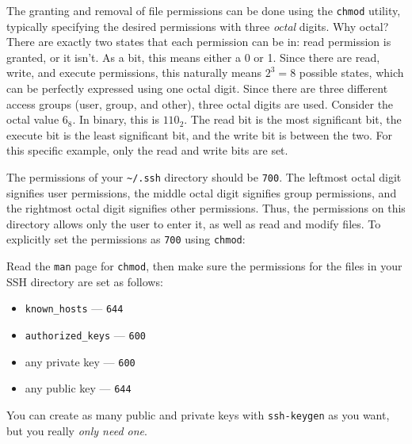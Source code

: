 The granting and removal of file permissions can be done using the
\texttt{chmod} utility, typically specifying the desired permissions
with three \emph{octal} digits. Why octal? There are exactly two states that
each permission can be in: read permission is granted, or it isn't. As a
bit, this means either a 0 or 1. Since there are read, write, and
execute permissions, this naturally means $2^3 = 8$ possible states,
which can be perfectly expressed using one octal digit. Since there are
three different access groups (user, group, and other), three octal
digits are used. Consider the octal value $6_8$. In binary, this is
$110_2$. The read bit is the most significant bit, the execute bit is
the least significant bit, and the write bit is between the two. For
this specific example, only the read and write bits are set.

The permissions of your \texttt{\textasciitilde/.ssh} directory should
be \texttt{700}. The leftmost octal digit signifies user permissions,
the middle octal digit signifies group permissions, and the rightmost
octal digit signifies other permissions. Thus, the permissions on this
directory allows only the user to enter it, as well as read and modify
files. To explicitly set the permissions as \texttt{700} using
\texttt{chmod}:


Read the \texttt{man} page for \texttt{chmod}, then make sure the
permissions for the files in your SSH directory are set as follows:
\begin{itemize}
  \item \texttt{known\_hosts} --- \texttt{644}
  \item \texttt{authorized\_keys} --- \texttt{600}
  \item any private key --- \texttt{600}
  \item any public key --- \texttt{644}
\end{itemize}

You can create as many public and private keys with \texttt{ssh-keygen}
as you want, but you really \emph{only need one}.
